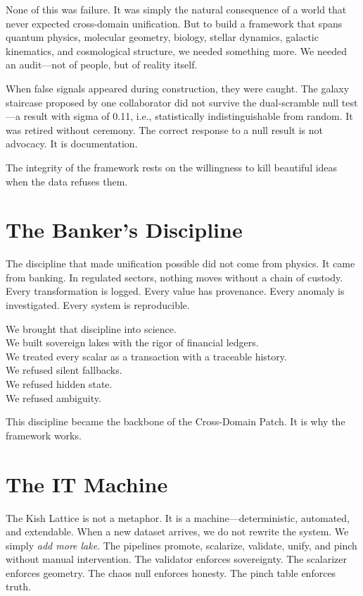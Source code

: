 \documentclass[11pt, letterpaper, openany]{book}
\begin{document}
None of this was failure. It was simply the natural consequence of a world that never expected
cross-domain unification. But to build a framework that spans quantum physics, molecular geometry,
biology, stellar dynamics, galactic kinematics, and cosmological structure, we needed something
more. We needed an audit---not of people, but of reality itself.

When false signals appeared during construction, they were caught. The galaxy staircase proposed
by one collaborator did not survive the dual-scramble null test---a result with sigma of 0.11, i.e.,
statistically indistinguishable from random. It was retired without ceremony. The correct response
to a null result is not advocacy. It is documentation.

The integrity of the framework rests on the willingness to kill beautiful ideas when the data
refuses them.

\section*{The Banker's Discipline}
The discipline that made unification possible did not come from physics. It came from banking.
In regulated sectors, nothing moves without a chain of custody. Every transformation is logged.
Every value has provenance. Every anomaly is investigated. Every system is reproducible.

We brought that discipline into science.\\
We built sovereign lakes with the rigor of financial ledgers.\\
We treated every scalar as a transaction with a traceable history.\\
We refused silent fallbacks.\\
We refused hidden state.\\
We refused ambiguity.

This discipline became the backbone of the Cross-Domain Patch. It is why the framework works.

\section*{The IT Machine}
The Kish Lattice is not a metaphor. It is a machine---deterministic, automated, and extendable.
When a new dataset arrives, we do not rewrite the system. We simply \textit{add more lake}. The
pipelines promote, scalarize, validate, unify, and pinch without manual intervention. The
validator enforces sovereignty. The scalarizer enforces geometry. The chaos null enforces
honesty. The pinch table enforces truth.
\end{document}

